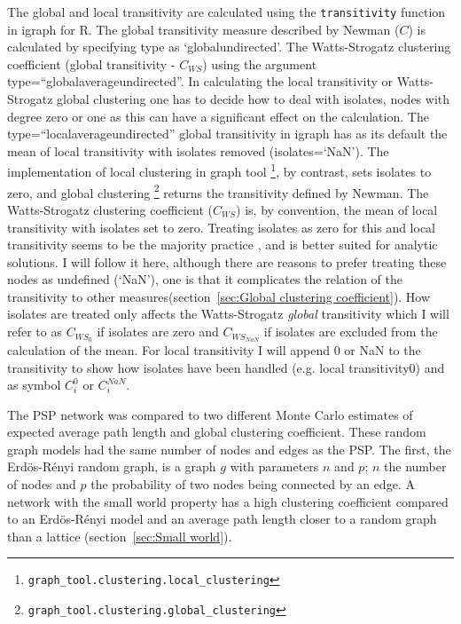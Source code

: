 The global and local transitivity are calculated using the \texttt{transitivity} function in igraph for R. The global transitivity measure described by Newman ($C$)\cite{newman2002random} is calculated by specifying type as `globalundirected'. The Watts-Strogatz clustering coefficient (global transitivity -  $C_{WS}$)\cite{watts1998collective} using the argument type=``globalaverageundirected''. In calculating the local transitivity or Watts-Strogatz global clustering one has to decide how to deal with isolates, nodes with degree zero or one as this can have a significant effect on the calculation\cite{schoch2006molecular}. The type=``localaverageundirected'' global transitivity in igraph has as its default the mean of local transitivity with isolates removed (isolates=`NaN'). The implementation of local clustering in graph tool \footnote{\texttt{graph\_tool.clustering.local\_clustering}}, by contrast, sets isolates to zero\cite{peixoto_graph-tool_2014}, and global clustering \footnote{\texttt{graph\_tool.clustering.global\_clustering}} returns the transitivity defined by Newman\cite{newman2002random}. The Watts-Strogatz clustering coefficient ($C_{WS}$) is, by convention, the mean of local transitivity with isolates set to zero\cite{newman2018networks}. Treating isolates as zero for this and local transitivity seems to be the majority practice \cite{wang2017comparison},\cite{newman2018networks} and is better suited for analytic solutions. I will follow it here, although there are reasons to prefer treating these nodes as undefined (`NaN'), one is that it complicates the relation of the transitivity to other measures(section~\ref{sec:Global clustering coefficient}). How isolates are treated only affects the Watts-Strogatz \textit{global} transitivity which I will refer to as $C_{WS_0}$ if isolates are zero and $C_{WS_{NaN}}$ if isolates are excluded from the calculation of the mean. For local transitivity I will append 0 or NaN to the transitivity to show how isolates have been handled (e.g. local transitivity0) and as symbol $C_i^0$ or $C_i^{NaN}$.  

The PSP network was compared to two different Monte Carlo estimates of expected average path length and global clustering coefficient. These random graph models had the same number of nodes and edges as the PSP. The first, the Erd{\"o}s-R{\'e}nyi random graph, is a graph $g$ with parameters $n$ and $p$; $n$ the number of nodes and $p$ the probability of two nodes being connected by an edge. A network with the small world property has a high clustering coefficient compared to an Erd{\"o}s-R{\'e}nyi model and an average path length closer to a random graph than a lattice (section~\ref{sec:Small world}). 

